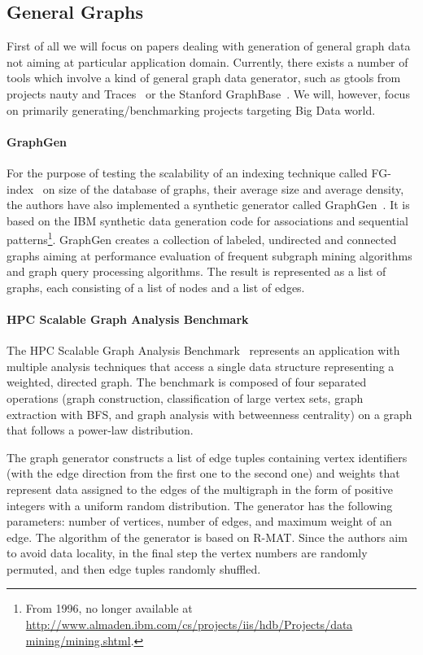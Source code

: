 \subsection{General Graphs}
\label{sec:generators_general}

First of all we will focus on papers dealing with generation of general graph data not aiming at particular application domain. Currently, there exists a number of tools which involve a kind of general graph data generator, such as gtools from projects nauty and Traces~\cite{gtools} or the Stanford GraphBase~\cite{GraphBase}. We will, however, focus on primarily generating/benchmarking projects targeting Big Data world.



\paragraph{GraphGen} For the purpose of testing the scalability of an indexing technique called FG-index~\cite{Cheng:2007:FTV:1247480.1247574} on size of the database of graphs, their average size and average density, the authors have also implemented a synthetic generator called GraphGen~\cite{GraphGen}. It is based on the IBM synthetic data generation code for associations and sequential patterns\footnote{From 1996, no longer available at \url{http://www.almaden.ibm.com/cs/projects/iis/hdb/Projects/data mining/mining.shtml}.}. GraphGen creates a collection of labeled, undirected and connected graphs aiming at performance evaluation of frequent subgraph mining algorithms and graph query processing algorithms. The result is represented as a list of graphs, each consisting of a list of nodes and a list of edges.



\paragraph{HPC Scalable Graph Analysis Benchmark} The HPC Scalable Graph Analysis Benchmark~\cite{HPCgraph,Bader:2005:DIH:2099301.2099360} represents an application with multiple analysis techniques that access a single data structure representing a weighted, directed graph. The benchmark is composed of four separated operations (graph construction, classification of large vertex sets, graph extraction with BFS, and graph analysis with betweenness centrality) on a graph that follows a power-law distribution.

The graph generator constructs a list of edge tuples containing vertex identifiers (with the edge direction from the first one to the second one) and weights that represent data assigned to the edges of the multigraph in the form of positive integers with a uniform random distribution. The generator has the following parameters: number of vertices, number of edges, and maximum weight of an edge. The algorithm of the generator is based on R-MAT. Since the authors aim to avoid data locality, in the final step the vertex numbers are randomly permuted, and then edge tuples randomly shuffled.

